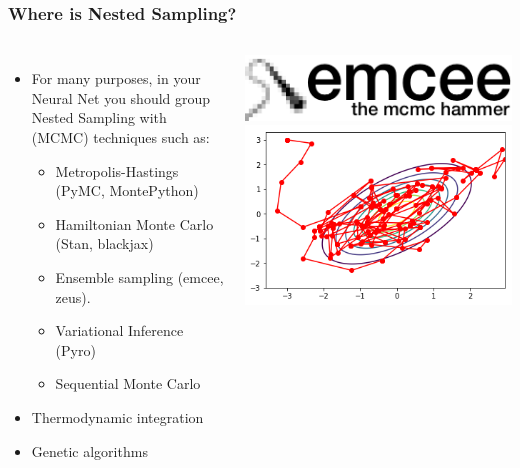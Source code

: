 \documentclass[aspectratio=169]{beamer}
\begin{document}
\begin{frame}
    \frametitle{Where is Nested Sampling?}
    \begin{columns}
        \begin{itemize}
            \item For many purposes, in your Neural Net you should group Nested Sampling with (MCMC) techniques such as:
                \begin{itemize}
                    \item Metropolis-Hastings (PyMC, MontePython)
                    \item Hamiltonian Monte Carlo (Stan, blackjax)
                    \item Ensemble sampling (emcee, zeus). 
                    \item Variational Inference (Pyro)
                    \item Sequential Monte Carlo \end{itemize}
                    \item Thermodynamic integration
                    \item Genetic algorithms
            \end{itemize}
        \begin{columns}
        \includegraphics[width=\textwidth]{figures/emcee}
        \includegraphics[width=\textwidth]{figures/metropolis-hastings}

\end{columns}
\end{columns}
\end{frame}
\end{document}
